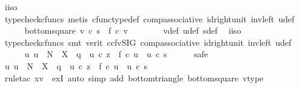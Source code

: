 \begin{isabellebody}
\ i{\isacharunderscore}{\kern0pt}iso\isanewline
\ \ \ \ \ \ \isamarkupfalse%
\ {\isacharparenleft}{\kern0pt}typecheck{\isacharunderscore}{\kern0pt}cfuncs{\isacharcomma}{\kern0pt}\ metis\ cfunc{\isacharunderscore}{\kern0pt}type{\isacharunderscore}{\kern0pt}def\ comp{\isacharunderscore}{\kern0pt}associative\ id{\isacharunderscore}{\kern0pt}right{\isacharunderscore}{\kern0pt}unit{}\ inv{\isacharunderscore}{\kern0pt}left\ u{\isacharunderscore}{\kern0pt}def{\isacharparenright}{\kern0pt}\isanewline
\ \ \ \ \isamarkupfalse%
\ bottom{\isacharunderscore}{\kern0pt}square{\isacharcolon}{\kern0pt}\ {\isachardoublequoteopen}v\ {\isasymcirc}\isactrlsub c\ s\ {\isacharequal}{\kern0pt}\ f\ {\isasymcirc}\isactrlsub c\ v{\isachardoublequoteclose}\isanewline
\ \ \ \ \ \ \isamarkupfalse%
\ v{\isacharunderscore}{\kern0pt}def\ u{\isacharunderscore}{\kern0pt}def\ s{\isacharunderscore}{\kern0pt}def\ \isamarkupfalse%
\ i{\isacharunderscore}{\kern0pt}iso\isanewline
\ \ \ \ \ \ \isamarkupfalse%
\ {\isacharparenleft}{\kern0pt}typecheck{\isacharunderscore}{\kern0pt}cfuncs{\isacharcomma}{\kern0pt}\ smt\ {\isacharparenleft}{\kern0pt}verit{\isacharcomma}{\kern0pt}\ ccfv{\isacharunderscore}{\kern0pt}SIG{\isacharparenright}{\kern0pt}\ comp{\isacharunderscore}{\kern0pt}associative{}\ id{\isacharunderscore}{\kern0pt}right{\isacharunderscore}{\kern0pt}unit{}\ inv{\isacharunderscore}{\kern0pt}left\ u{\isacharunderscore}{\kern0pt}def{\isacharparenright}{\kern0pt}\isanewline
\ \ \ \ \isamarkupfalse%
\ {\isachardoublequoteopen}{\isasymexists}{\isacharbang}{\kern0pt}u{\isachardot}{\kern0pt}\ u\ {\isacharcolon}{\kern0pt}\ N\ {\isasymrightarrow}\ X\ {\isasymand}\ q\ {\isacharequal}{\kern0pt}\ u\ {\isasymcirc}\isactrlsub c\ z\ {\isasymand}\ f\ {\isasymcirc}\isactrlsub c\ u\ {\isacharequal}{\kern0pt}\ u\ {\isasymcirc}\isactrlsub c\ s{\isachardoublequoteclose}\isanewline
\ \ \ \ \isamarkupfalse%
\ safe\isanewline
\ \ \ \ \ \ \isamarkupfalse%
\ {\isachardoublequoteopen}{\isasymexists}u{\isachardot}{\kern0pt}\ u\ {\isacharcolon}{\kern0pt}\ N\ {\isasymrightarrow}\ X\ {\isasymand}\ q\ {\isacharequal}{\kern0pt}\ u\ {\isasymcirc}\isactrlsub c\ z\ {\isasymand}\ f\ {\isasymcirc}\isactrlsub c\ u\ {\isacharequal}{\kern0pt}\ u\ {\isasymcirc}\isactrlsub c\ s{\isachardoublequoteclose}\isanewline
\ \ \ \ \ \ \ \ \isamarkupfalse%
\ {\isacharparenleft}{\kern0pt}rule{\isacharunderscore}{\kern0pt}tac\ x{\isacharequal}{\kern0pt}v\ \ exI{\isacharcomma}{\kern0pt}\ auto\ simp\ add{\isacharcolon}{\kern0pt}\ bottom{\isacharunderscore}{\kern0pt}triangle\ bottom{\isacharunderscore}{\kern0pt}square\ v{\isacharunderscore}{\kern0pt}type{\isacharparenright}{\kern0pt}\isanewline

\end{isabellebody}
